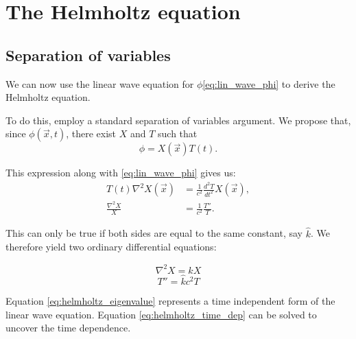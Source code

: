 \section{The Helmholtz equation}
\subsection{Separation of variables}\label{ss:ch1_sep_of_vars}
We can now use the linear wave equation for $\phi $\eqref{eq:lin_wave_phi} to derive the Helmholtz equation. \par
%
To do this, employ a standard separation of variables argument. We propose that, since $\phi(\vec{x}, t)$, there exist $X$ and $T$ such that
    \begin{equation}\label{eq:phi_separation}
        \phi = X(\vec{x})T(t).
    \end{equation}\par
%
This expression along with \eqref{eq:lin_wave_phi} gives us:
    \begin{align*}
        T(t) \nabla^2 X(\vec{x})
        &= \frac{1}{c^2} \frac{d^2 T}{dt^2} X(\vec{x}), \\
        \frac{\nabla^2 X}{X} &= \frac{1}{c^2} \frac{T''}{T}.
    \end{align*}\par
%
This can only be true if both sides are equal to the same constant, say $\hat{k}$. We therefore yield two ordinary differential equations:
    \begin{multicols}{2}
    \noindent
        \begin{equation} \label{eq:helmholtz_eigenvalue}
            \nabla^2 X = \hat{k} X
        \end{equation}
        \begin{equation}\label{eq:helmholtz_time_dep}
            T'' = \hat{k}c^2 T
        \end{equation}
    \end{multicols}\par
%
Equation \eqref{eq:helmholtz_eigenvalue} represents a time independent form of the linear wave equation. Equation \eqref{eq:helmholtz_time_dep} can be solved to uncover the time dependence.\par
%
